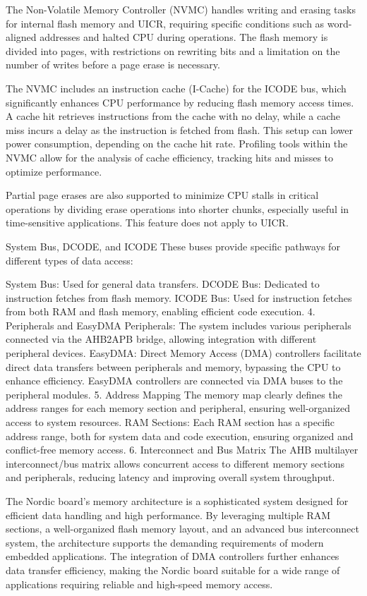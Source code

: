 \documentclass{Configuration_Files/PoliMi3i_thesis}
\begin{document}
The Non-Volatile Memory Controller (NVMC) handles writing and erasing tasks for internal flash memory and UICR, requiring specific conditions such as word-aligned addresses and halted CPU during operations. The flash memory is divided into pages, with restrictions on rewriting bits and a limitation on the number of writes before a page erase is necessary.

The NVMC includes an instruction cache (I-Cache) for the ICODE bus, which significantly enhances CPU performance by reducing flash memory access times. A cache hit retrieves instructions from the cache with no delay, while a cache miss incurs a delay as the instruction is fetched from flash. This setup can lower power consumption, depending on the cache hit rate. Profiling tools within the NVMC allow for the analysis of cache efficiency, tracking hits and misses to optimize performance.

Partial page erases are also supported to minimize CPU stalls in critical operations by dividing erase operations into shorter chunks, especially useful in time-sensitive applications. This feature does not apply to UICR.

System Bus, DCODE, and ICODE
These buses provide specific pathways for different types of data access:

System Bus: Used for general data transfers.
DCODE Bus: Dedicated to instruction fetches from flash memory.
ICODE Bus: Used for instruction fetches from both RAM and flash memory, enabling efficient code execution.
4. Peripherals and EasyDMA
Peripherals: The system includes various peripherals connected via the AHB2APB bridge, allowing integration with different peripheral devices.
EasyDMA: Direct Memory Access (DMA) controllers facilitate direct data transfers between peripherals and memory, bypassing the CPU to enhance efficiency. EasyDMA controllers are connected via DMA buses to the peripheral modules.
5. Address Mapping
The memory map clearly defines the address ranges for each memory section and peripheral, ensuring well-organized access to system resources.
RAM Sections: Each RAM section has a specific address range, both for system data and code execution, ensuring organized and conflict-free memory access.
6. Interconnect and Bus Matrix
The AHB multilayer interconnect/bus matrix allows concurrent access to different memory sections and peripherals, reducing latency and improving overall system throughput.

The Nordic board's memory architecture is a sophisticated system designed for efficient data handling and high performance. By leveraging multiple RAM sections, a well-organized flash memory layout, and an advanced bus interconnect system, the architecture supports the demanding requirements of modern embedded applications. The integration of DMA controllers further enhances data transfer efficiency, making the Nordic board suitable for a wide range of applications requiring reliable and high-speed memory access.
\end{document}
